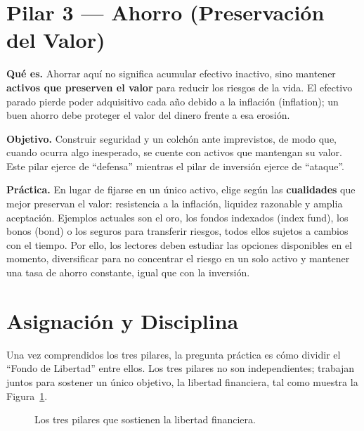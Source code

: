 \documentclass[10pt,a4paper,twocolumn]{article}
\begin{document}
\section{Pilar 3 --- Ahorro (Preservaci\'on del Valor)}
\textbf{Qu\'e es.} Ahorrar aqu\'i no significa acumular efectivo inactivo, sino mantener \textbf{activos que preserven el valor} para reducir los riesgos de la vida. El efectivo parado pierde poder adquisitivo cada a\~no debido a la inflaci\'on (inflation); un buen ahorro debe proteger el valor del dinero frente a esa erosi\'on.

\textbf{Objetivo.} Construir seguridad y un colch\'on ante imprevistos, de modo que, cuando ocurra algo inesperado, se cuente con activos que mantengan su valor. Este pilar ejerce de ``defensa'' mientras el pilar de inversi\'on ejerce de ``ataque''.

\textbf{Pr\'actica.} En lugar de fijarse en un \'unico activo, elige seg\'un las \textbf{cualidades} que mejor preservan el valor: resistencia a la inflaci\'on, liquidez razonable y amplia aceptaci\'on. Ejemplos actuales son el oro, los fondos indexados (index fund), los bonos (bond) o los seguros para transferir riesgos, todos ellos sujetos a cambios con el tiempo. Por ello, los lectores deben estudiar las opciones disponibles en el momento, diversificar para no concentrar el riesgo en un solo activo y mantener una tasa de ahorro constante, igual que con la inversi\'on.

\section{Asignaci\'on y Disciplina}
Una vez comprendidos los tres pilares, la pregunta pr\'actica es c\'omo dividir el ``Fondo de Libertad'' entre ellos. Los tres pilares no son independientes; trabajan juntos para sostener un \'unico objetivo, la libertad financiera, tal como muestra la Figura~\ref{fig:pillars}.

\begin{figure}[t]
\centering
{}
\caption{Los tres pilares que sostienen la libertad financiera.}
\label{fig:pillars}
\end{figure}
\end{document}
